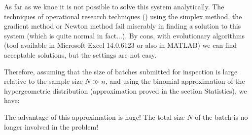 	As far as we knoe it is not possible to solve this system analytically. The techniques of operational research techniques  () using the simplex method, the gradient method or Newton method fail miserably in finding a solution to this system (which is quite normal in fact...). By cons, with evolutionary algorithms (tool available in Microsoft Excel 14.0.6123 or also in MATLAB) we can find acceptable solutions, but the settings are not easy.

	Therefore, assuming that the size of batches submitted for inspection is large relative to the sample size $N\gg n$, and using the binomial approximation of the hypergeometric distribution (approximation proved in the section Statistics), we have:
	
	The advantage of this approximation is huge! The total size $N$ of the batch is no longer involved in the problem!
